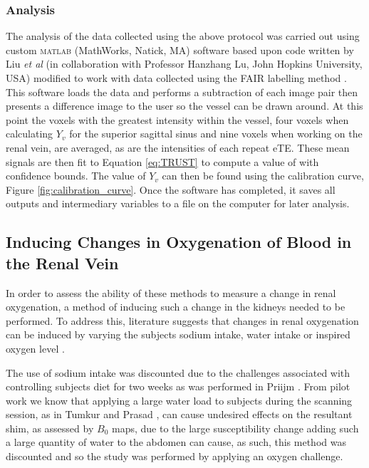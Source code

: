 \subsubsection{Analysis}
\label{sec:trust_analysis}
The analysis of the data collected using the above protocol was carried out using custom \textsc{matlab} (MathWorks, Natick, MA) software based upon code written by Liu \textit{et al} (in collaboration with Professor Hanzhang Lu, John Hopkins University, USA) modified to work with data collected using the \ac{FAIR} labelling method \cite{liu_pro_2011}. This software loads the data and performs a subtraction of each image pair then presents a difference image to the user so the vessel can be drawn around. At this point the voxels with the greatest intensity within the vessel, four voxels when calculating $Y_v$ for the superior sagittal sinus and nine voxels when working on the renal vein, are averaged, as are the intensities of each repeat \ac{eTE}. These mean signals are then fit to Equation \eqref{eq:TRUST} to compute a value of \ttwo with confidence bounds. The value of $Y_v$ can then be found using the calibration curve, Figure \ref{fig:calibration_curve}. Once the software has completed, it saves all outputs and intermediary variables to a file on the computer for later analysis.

\subsection{Inducing Changes in Oxygenation of Blood in the Renal Vein}

In order to assess the ability of these methods to measure a change in renal oxygenation, a method of inducing such a change in the kidneys needed to be performed. To address this, literature suggests that changes in renal oxygenation can be induced by varying the subjects sodium intake, water intake or inspired oxygen level \cite{oconnor_comparison_2009, donati_quantitative_2012}.

The use of sodium intake was discounted  due to the challenges associated with controlling subjects diet for two weeks as was performed in Priijm \cite{pruijm_effect_2010}. From pilot work we know that applying a large water load to subjects during the scanning session, as in Tumkur and Prasad  \cite{tumkur_evaluation_2006, prasad_changes_1999}, can cause undesired effects on the resultant shim, as assessed by $B_0$ maps, due to the large susceptibility change adding such a large quantity of water to the abdomen can cause, as such, this method was discounted and so the study was performed by applying an oxygen challenge.

